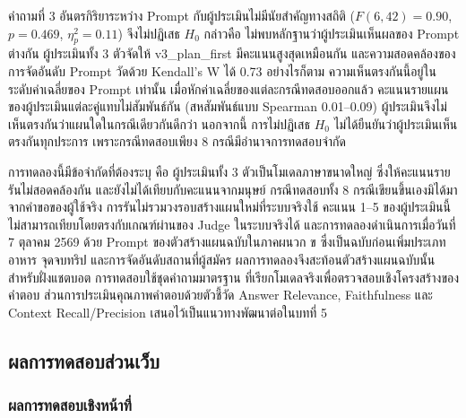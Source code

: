คำถามที่ 3 อันตรกิริยาระหว่าง Prompt กับผู้ประเมินไม่มีนัยสำคัญทางสถิติ ($F(6, 42) = 0.90$, $p = 0.469$, $\eta^2_p = 0.11$) จึงไม่ปฏิเสธ $H_0$ กล่าวคือ ไม่พบหลักฐานว่าผู้ประเมินเห็นผลของ Prompt ต่างกัน ผู้ประเมินทั้ง 3 ตัวจัดให้ v3\_plan\_first มีคะแนนสูงสุดเหมือนกัน และความสอดคล้องของการจัดอันดับ Prompt วัดด้วย Kendall's W ได้ 0.73 อย่างไรก็ตาม ความเห็นตรงกันนี้อยู่ในระดับค่าเฉลี่ยของ Prompt เท่านั้น เมื่อหักค่าเฉลี่ยของแต่ละกรณีทดสอบออกแล้ว คะแนนรายแผนของผู้ประเมินแต่ละคู่แทบไม่สัมพันธ์กัน (สหสัมพันธ์แบบ Spearman 0.01--0.09) ผู้ประเมินจึงไม่เห็นตรงกันว่าแผนใดในกรณีเดียวกันดีกว่า นอกจากนี้ การไม่ปฏิเสธ $H_0$ ไม่ได้ยืนยันว่าผู้ประเมินเห็นตรงกันทุกประการ เพราะกรณีทดสอบเพียง 8 กรณีมีอำนาจการทดสอบจำกัด

การทดลองนี้มีข้อจำกัดที่ต้องระบุ คือ ผู้ประเมินทั้ง 3 ตัวเป็นโมเดลภาษาขนาดใหญ่ ซึ่งให้คะแนนรายรันไม่สอดคล้องกัน และยังไม่ได้เทียบกับคะแนนจากมนุษย์ กรณีทดสอบทั้ง 8 กรณีเขียนขึ้นเองมิได้มาจากคำขอของผู้ใช้จริง การรันไม่รวมวงรอบสร้างแผนใหม่ที่ระบบจริงใช้ คะแนน 1--5 ของผู้ประเมินนี้ไม่สามารถเทียบโดยตรงกับเกณฑ์ผ่านของ Judge ในระบบจริงได้ และการทดลองดำเนินการเมื่อวันที่ 7 ตุลาคม 2569 ด้วย Prompt ของตัวสร้างแผนฉบับในภาคผนวก ข ซึ่งเป็นฉบับก่อนเพิ่มประเภทอาหาร จุดจบทริป และการจัดอันดับสถานที่ผู้สมัคร ผลการทดลองจึงสะท้อนตัวสร้างแผนฉบับนั้น สำหรับฝั่งแชตบอต การทดสอบใช้ชุดคำถามมาตรฐาน ที่เรียกโมเดลจริงเพื่อตรวจสอบเชิงโครงสร้างของคำตอบ ส่วนการประเมินคุณภาพคำตอบด้วยตัวชี้วัด Answer Relevance, Faithfulness และ Context Recall/Precision เสนอไว้เป็นแนวทางพัฒนาต่อในบทที่ 5

\subsection{ผลการทดสอบส่วนเว็บ}

\subsubsection{ผลการทดสอบเชิงหน้าที่}


